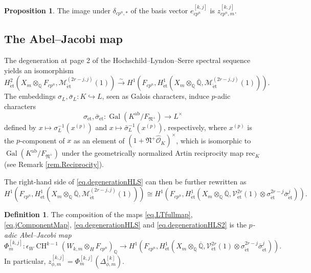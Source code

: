 \documentclass[a4paper]{amsart}
\numberwithin{equation}{section}
\theoremstyle{definition}
\newtheorem{proposition}[theorem]{Proposition}
\newtheorem{definition}[theorem]{Definition}
\newcommand{\Q}{\mathbb{Q}}
\DeclareMathOperator{\Gal}{Gal}
\DeclareMathOperator{\CH}{CH}
\DeclareMathOperator{\et}{\text{\'et}}
\newcommand{\rec}{\mathrm{rec}}
\renewcommand{\et}{\mathrm{\acute{e}t}}
\begin{document}
\begin{proposition}\label{prop.Gysin}
The image under $\delta_{cp^n,\ast}$ of the basis vector $e_{cp^n}^{[k,j]}$ is $z_{cp^n,m}^{[k,j]}$.
\end{proposition}

\subsection{The Abel--Jacobi map}\label{subsec.AbelJacobi}
The degeneration at page 2 of the Hochschild--Lyndon--Serre spectral sequence \cite[\S 1.2]{Nekovar.Banff} yields an isomorphism
\begin{equation}\label{eq.degenerationHLS}
H^2_{\et}\left({X}_m\otimes_\Q F_{cp^n},\mathscr{M}^{(2r-j,j)}_{\et}(1)\right)\stackrel{\sim}{\longrightarrow}H^1\left(F_{cp^n},H^1_{\et}({X}_m\otimes_\Q\overline{\Q},\mathscr{M}^{(2r-j,j)}_{\et}(1))\right).\end{equation}
The embeddings $\sigma_L,\bar{\sigma}_L\colon K\hookrightarrow L$, seen as Galois characters, induce $p$-adic characters
\[\sigma_{\et},\bar\sigma_{\et}\colon \Gal(K^\mathrm{ab}/F_{\mathfrak{N}^+})\longrightarrow L^\times\] defined by $x\mapsto \sigma_L^{-1}(x^{(p)})$ 
and $x\mapsto\bar\sigma_L^{-1}(x^{(p)})$, respectively, where $x^{(p)}$ is the $p$-component of $x$ as an element of $(1+\mathfrak{N}^+\widehat{\mathcal{O}}_K)^\times$, which is isomorphic to $\Gal(K^\mathrm{ab}/F_{\mathfrak{N^+}})$ under the geometrically normalized Artin reciprocity map $\rec_K$ (see Remark \ref{rem.Reciprocity}).

The right-hand side of \eqref{eq.degenerationHLS} can then be further rewritten as
\begin{equation}\label{eq.degenerationHLS2}
H^1\left(F_{cp^n},H^1_{\et}({X}_m\otimes_\Q\overline{\Q},\mathscr{M}^{(2r-j,j)}_{\et}(1))\right)\cong H^1\left(F_{cp^n},H^1_{\et}({X}_m\otimes_\Q\overline{\Q},\mathscr{V}^{2r}_{\et}(1)\otimes\sigma_{\et}^{2r-j}\bar{\sigma}_{\et}^j)\right).
\end{equation}

\begin{definition}
The composition of the maps \eqref{eq.LTfullmap}, \eqref{eq.jComponentMap}, \eqref{eq.degenerationHLS} and \eqref{eq.degenerationHLS2} is the \emph{$p$-adic Abel--Jacobi map} 
\begin{equation}\label{eq.AbelJacobi}
\Phi_m^{[k,j]}\colon \epsilon_{W}\CH^{k-1}(W_{k,m}\otimes_HF_{cp^n})_\Q\longrightarrow H^1\left(F_{cp^n},H^1_{\et}({X}_m\otimes_\Q\overline{\Q},\mathscr{V}^{2r}_{\et}(1)\otimes\sigma_{\et}^{2r-j}\bar{\sigma}^j_{\et})\right).
\end{equation}
In particular, $z_{\phi,m}^{[k,j]}=\Phi_m^{[k,j]}(\Delta_{\phi,m}^{[k]}).$ 
\end{definition}
\end{document}
